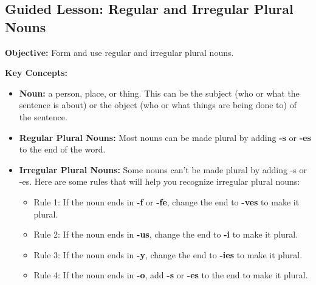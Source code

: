 \documentclass[12pt]{article}
\title{}
\date{}
\begin{document}
\subsection*{Guided Lesson: Regular and Irregular Plural Nouns}
\onehalfspacing

\begin{tcolorbox}[colframe=black!40, colback=gray!5, 
coltitle=black, colbacktitle=black!20, fonttitle=\bfseries\Large, 
title=Learning Objective, halign title=center, left=5pt, right=5pt, top=5pt, bottom=15pt]
\textbf{Objective:} Form and use regular and irregular plural nouns.
\end{tcolorbox}

\vspace{1em}

\begin{tcolorbox}[colframe=black!60, colback=white, 
coltitle=black, colbacktitle=black!15, fonttitle=\bfseries\Large, 
title=Key Concepts and Vocabulary, halign title=center, left=10pt, right=10pt, top=10pt, bottom=15pt]
\textbf{Key Concepts:}
\begin{itemize}
    \item \textbf{Noun:} a person, place, or thing. This can be the subject (who or what the sentence is about) or the object (who or what things are being done to) of the sentence.
    \item \textbf{Regular Plural Nouns:} Most nouns can be made plural by adding \textbf{-s} or \textbf{-es }to the end of the word.
    \item \textbf{Irregular Plural Nouns:} Some nouns can't be made plural by adding -s or -es. Here are some rules that will help you recognize irregular plural nouns:
    \begin{itemize}
        \item Rule 1: If the noun ends in \textbf{-f} or \textbf{-fe}, change the end to \textbf{-ves} to make it plural.
        \item Rule 2: If the noun ends in \textbf{-us},  change the end to \textbf{-i} to make it plural.
        \item Rule 3: If the noun ends in \textbf{-y}, change the end to \textbf{-ies} to make it plural.
        \item Rule 4: If the noun ends in \textbf{-o}, add \textbf{-s} or \textbf{-es} to the end to make it plural.
    \end{itemize}
\end{itemize}

\end{tcolorbox}
\end{document}
